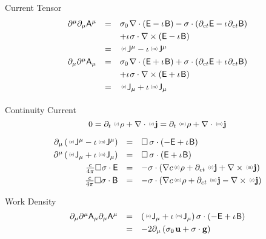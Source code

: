 \documentclass[aps,twocolumn,secnumarabic,nobalancelastpage,amsmath,amssymb,
amsthm,nofootinbib,parskip=full]{revtex4}
\numberwithin{equation}{section}
\newcommand{\iu}{\iota\mkern1mu}
\newcommand{\pauli}[1]{\sigma_#1\mkern2mu}
\newcommand{\qv}[1]{\mathbf{\mathsf{#1}}}
\newcommand{\ppv}[2]{{\,\raisebox{2pt}{\scalebox{.5}{(#1)\,}}}#2}
\newcommand{\qvl}[2]{\ppv{#1}{\mathbf{\mathsf{#2}}}}
\newcommand{\sv}[1]{\mathbf{#1}}
\newcommand{\svl}[2]{\ppv{#1}{\sv{#2}}}
\newcommand{\ssl}[2]{\ppv{#1}{#2}}
\begin{document}
Current Tensor
\begin{equation*}
\begin{array}{rcl}
\partial^\mu\partial_\mu\qv{A}^\mu&=&
         \pauli{0}\nabla\cdot\left(\qv{E}-\iu\qv{B}\right)
        -\sigma\cdot\left(\partial_{ct}\qv{E}-
                                   \iu\partial_{ct}\qv{B}\right) \\[3pt]
      &&+\iu\sigma\cdot\nabla\times\left(\qv{E}-\iu\qv{B}\right) \\[3pt]
   &=&\qvl{e}{J}^\mu-\iu\qvl{m}{J}^\mu \\[3pt]
\partial_\mu\partial^\mu\qv{A}_\mu&=&
        \pauli{0}\nabla\cdot\left(\qv{E}+\iu\qv{B}\right)
        +\sigma\cdot\left(\partial_{ct}\qv{E}+
                                    \iu\partial_{ct}\qv{B}\right) \\[3pt]     &&+\iu\sigma\cdot\nabla\times\left(\qv{E}+\iu\qv{B}\right) \\[3pt]
   &=&\qvl{e}{J}_\mu+\iu\qvl{m}{J}_\mu \\[3pt]
\end{array}
\end{equation*}

Continuity Current
\begin{equation*}
0=\partial_t\,\ssl{e}{\rho}+\nabla\cdot\svl{e}{j}=
  \partial_t\,\ssl{m}{\rho}+\nabla\cdot\svl{m}{j}
\end{equation*}

\begin{equation*}
\begin{array}{rcl}
\partial_\mu\left(\qvl{e}{J}^\mu-\iu\qvl{m}{J}^\mu\right)&=&
\Box\,\sigma\cdot\left(-\qv{E}+\iu\qv{B}\right) \\[3pt]
\partial^\mu\left(\qvl{e}{J}_\mu+\iu\qvl{m}{J}_\mu\right)&=&
\Box\,\sigma\cdot\left(\qv{E}+\iu\qv{B}\right) \\[3pt]
\frac{c}{4\pi}\Box\sigma\cdot\qv{E}
       &=&-\sigma\cdot\left(\nabla c\ssl{e}{\rho}+\partial_{ct}\,\svl{e}{j}
          +\nabla\times\svl{m}{j}\right) \\[3pt]
\frac{c}{4\pi}\Box\sigma\cdot\qv{B}
       &=&-\sigma\cdot\left(\nabla c\ssl{m}{\rho}+\partial_{ct}\,\svl{m}{j}
          -\nabla\times\svl{e}{j}\right)
\end{array}
\end{equation*}

Work Density
\begin{equation*}
\begin{array}{rcl}
  \partial_\mu\partial^\mu\qv{A}_\mu\partial_\mu\qv{A}^\mu&=&
              \left(\qvl{e}{J}_\mu+\iu\qvl{m}{J}_\mu\right)
              \sigma\cdot\left(-\qv{E}+\iu\qv{B}\right) \\[3pt]
  &=&-2\partial_\mu
      \left(\pauli{0}\mathbf{u}+\sigma\cdot\mathbf{g}\right)
\end{array}
\end{equation*}
\end{document}
